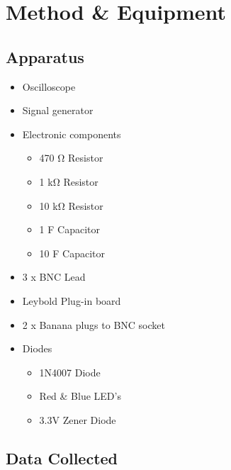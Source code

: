 \documentclass[12pt]{article}
\begin{document}
\section{Method \& Equipment}


\subsection{Apparatus}

\begin{multicols}{2}
\begin{itemize}
	\item Oscilloscope
    \item Signal generator
    \item Electronic components \begin{itemize}
    \item 470 {\si{\ohm}} Resistor
    \item 1 k{\si{\ohm}} Resistor
    \item 10 k{\si{\ohm}} Resistor
    \item 1 {\si{\mu}}F Capacitor
    \item 10 {\si{\mu}}F Capacitor 
    \end{itemize}
    \item 3 x BNC Lead
    \item Leybold Plug-in board
    \item 2 x Banana plugs to BNC socket
    \item Diodes \begin{itemize}
    \item 1N4007 Diode
    \item Red \& Blue LED's
    \item 3.3V Zener Diode
    \end{itemize}
\end{itemize}
\end{multicols}


\subsection{Data Collected}
\end{document}
